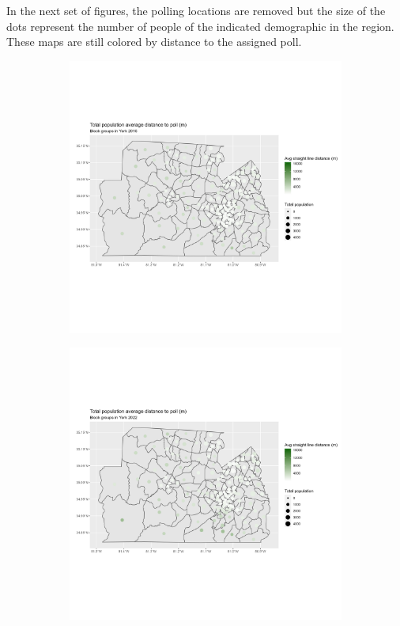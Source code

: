 \documentclass[11pt]{article}
\theoremstyle{remark}
\theoremstyle{definition}
\begin{document}
In the next set of figures, the polling locations are removed but the size of the dots represent the number of people of the indicated demographic in the region. These maps are still colored by distance to the assigned poll.

\begin{figure}
	\begin{subfigure}{.5\textwidth}
		\centering
		\includegraphics[width=\linewidth]{result analysis/York_SC_original_configs/population_pop_and_dist_York_config_original_2016_polls.png}
		\label{sfig:York_2016_bg_dist_pop}
	\end{subfigure} 
	\begin{subfigure}{.5\textwidth}
		\centering
		\includegraphics[width=\linewidth]{result analysis/York_SC_original_configs/population_pop_and_dist_York_config_original_2022_polls.png}

\end{subfigure}
\end{figure}
\end{document}
